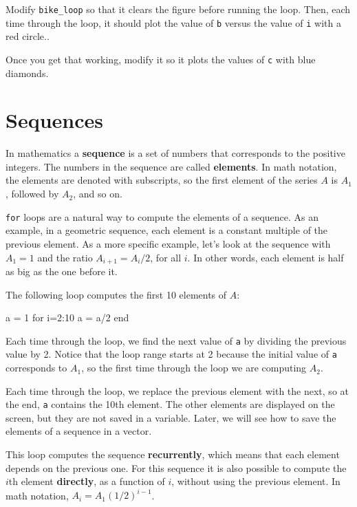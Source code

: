 \documentclass[
]{book}
\numberwithin{Answer}{chapter}
\numberwithin{Exercise}{chapter}
\begin{document}
\begin{ex}
Modify \verb"bike_loop" so that it clears the figure before running the loop.  Then, each time through the
loop, it should plot the value of {\tt b} versus the value of {\tt i} with a red circle..

Once you get that working, modify it so it plots the values of {\tt c} with blue diamonds.
\end{ex}


\section{Sequences}

In mathematics a {\bf sequence} is a set of numbers that corresponds
to the positive integers.  The numbers in the sequence are
called {\bf elements}.  In math notation, the elements
are denoted with subscripts, so the first element of the series $A$ is
$A_1$, followed by $A_2$, and so on.

{\tt for} loops are a natural way to compute the elements of a sequence.
As an example, in a geometric sequence, each element is a constant
multiple of the previous element.  As a more specific example, let's
look at the sequence with $A_1 = 1$ and the ratio $A_{i+1} = A_i/2$,
for all $i$.  In other words, each element is half as big as the one
before it.

The following loop computes the first 10 elements of $A$:

\begin{code}
a = 1
for i=2:10
    a = a/2
end
\end{code}

Each time through the loop, we find the next value of {\tt a}
by dividing the previous value by 2.  Notice that the loop
range starts at 2 because the initial value of {\tt a} corresponds
to $A_1$, so the first time through the loop we are computing
$A_2$.

Each time through the loop, we replace the previous element with
the next, so at the end, {\tt a} contains the 10th element.  The
other elements are displayed on the screen, but they are not saved
in a variable.  Later, we will see how to save the elements
of a sequence in a vector.

This loop computes the sequence {\bf recurrently}, which means
that each element depends on the previous one.
For this sequence it is also possible to compute the $i$th element
{\bf directly}, as a function of $i$, without using the previous element.
In math notation, $A_i = A_1 (1/2)^{i-1}$. 
\end{document}
